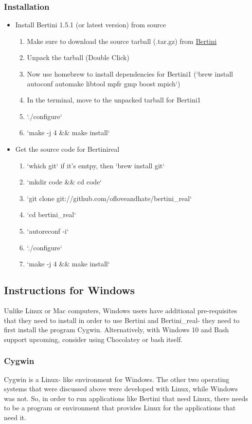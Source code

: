   \subsubsection{Installation}
  \begin{itemize}
    \item Install Bertini 1.5.1 (or latest version) from source
     \begin{enumerate}
      \item Make sure to download the source tarball (.tar.gz) from \href{http://bertini.nd.edu}{Bertini}
      \item Unpack the tarball (Double Click)
      \item Now use homebrew to install dependencies for Bertini1 (`brew install autoconf automake libtool mpfr gmp boost mpich`)
      \item In the terminal, move to the unpacked tarball for Bertini1
      \item `./configure`
      \item `make -j 4 \&\& make install`
    \end{enumerate}
    \item Get the source code for Bertinireal  
     \begin{enumerate}
      \item `which git`  if it's emtpy, then `brew install git`
      \item `mkdir code \&\& cd code`
      \item `git clone git://github.com/ofloveandhate/bertini\_real`
      \item `cd bertini\_real`
      \item `autoreconf -i`
      \item `./configure`
      \item `make -j 4 \&\& make install` 
     \end{enumerate} 
  \end{itemize}  


	\subsection{Instructions for Windows}
Unlike Linux or Mac computers, Windows users have additional pre-requisites that they need to install in order to use Bertini and Bertini\_real- they need to first install the program Cygwin.  Alternatively, with Windows 10 and Bash support upcoming, consider using Chocolatey or bash itself.

	\subsubsection{Cygwin}
Cygwin is a Linux- like environment for Windows. The other two operating systems that were discussed above were developed with Linux, while Windows was not. So, in order to run applications like Bertini that need Linux, there needs to be a program or environment that provides Linux for the applications that need it. 

